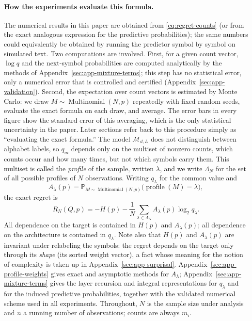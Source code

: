 \documentclass[11pt]{article}
\newcommand{\Nseq}{N}
\newcommand{\model}{\mathcal{M}_{d,L}}
\begin{document}
\paragraph{How the experiments evaluate this formula.}
\label{par:how-computed}
The numerical results in this paper are obtained from
\eqref{eq:regret-counts} (or from the exact analogous expression for the
predictive probabilities); the same numbers could equivalently be obtained by
running the predictor symbol by symbol on simulated text.  Two computations are involved.  First, for a given count
vector, \(\log q\) and the next-symbol probabilities are computed
analytically by the methods of Appendix~\ref{sec:app-mixture-terms}; this
step has no statistical error, only a numerical error that is controlled
and certified (Appendix~\ref{sec:app-validation}).  Second, the expectation
over count vectors is estimated by Monte Carlo: we draw
\(M\sim\operatorname{Multinomial}(\Nseq,p)\) repeatedly with fixed random
seeds, evaluate the exact formula on each draw, and average.  The error
bars in every figure show the standard error of this averaging, which is
the only statistical uncertainty in the paper.  Later sections refer back
to this procedure simply as ``evaluating the exact formula.''
The model \(\model\) does not distinguish between alphabet labels, so
\(q_m\) depends only on the multiset of nonzero counts, which counts
occur and how many times, but not which symbols carry them.  This multiset
is called the \emph{profile} of the sample, written \(\lambda\), and we
write \(\Lambda_\Nseq\) for the set of all possible profiles of \(\Nseq\)
observations. Writing \(q_\lambda\) for the common value and
\[
  A_\lambda(p)
  =
  \mathbb P_{M\sim\operatorname{Multinomial}(\Nseq,p)}
  \bigl(\operatorname{profile}(M)=\lambda\bigr),
\]
the exact regret is
\begin{equation}
\label{eq:regret-profiles}
  R_\Nseq(Q,p)
  =
  -H(p)
  -
  \frac{1}{\Nseq}
  \sum_{\lambda\in\Lambda_\Nseq}
    A_\lambda(p)\log_2 q_\lambda .
\end{equation}
All dependence on the target is contained in \(H(p)\) and \(A_\lambda(p)\);
all dependence on the architecture is contained in \(q_\lambda\).  Note also
that \(H(p)\) and \(A_\lambda(p)\) are invariant under relabeling the
symbols: the regret depends on the target only through its \emph{shape}
(its sorted weight vector), a fact whose meaning for the notion of
complexity is taken up in Appendix~\ref{sec:app-surprisal}.
Appendix~\ref{sec:app-profile-weights} gives exact and asymptotic methods for
\(A_\lambda\); Appendix~\ref{sec:app-mixture-terms} gives the layer recursion
and integral representations for \(q_\lambda\) and for the induced predictive
probabilities, together with the validated numerical scheme used in all
experiments.  
 Throughout, \(\Nseq\) is the sample size under
  analysis and \(n\) a running number of observations; counts are always
  \(m_i\).
  
\end{document}
